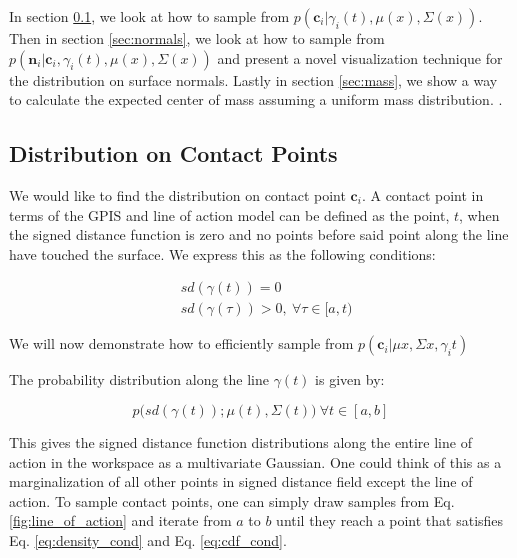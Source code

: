 \documentclass[letterpaper, 10 pt, conference]{ieeeconf}  %
\begin{document}
 In section \ref{sec:contact}, we look at how to sample from $p(\textbf{c}_i|\gamma_i(t),\mu(x),\Sigma(x))$. Then in section \ref{sec:normals}, we look at how to sample from $p(\textbf{n}_i|\textbf{c}_i,\gamma_i(t),\mu(x),\Sigma(x))$ and present a novel visualization technique for the distribution on surface normals. Lastly in section \ref{sec:mass}, we show a way to calculate the expected center of mass assuming a uniform mass distribution. 
 .
\subsection{Distribution on Contact Points}\label{sec:contact} 
We would like to find the distribution on contact point $\textbf{c}_i$. A contact point in terms of the GPIS and line of action model can be defined as the point, $t$, when the signed distance function is zero and no points before said point along the line have touched the surface. We express this as the following conditions: 

\vspace{-2ex}
\begin{align}
 &sd(\gamma(t)) = 0 \label{eq:density_cond} \\
&sd(\gamma(\tau)) > 0, \: \forall \tau \in [a,t) \label{eq:cdf_cond}
\end{align}

We will now demonstrate how to efficiently sample from $p(\textbf{c}_i|\mu{x},\Sigma{x},\gamma_i{t})$

The probability distribution along the line $\gamma(t)$ is given by:

\vspace{-2ex}
\begin{equation} \label{eq:line_of_act_dist}
p\big(sd(\gamma(t)) ; \mu(t),\Sigma(t)\big) \ \forall t \in [a,b] 
\end{equation}

This gives the signed distance function distributions along the entire line of action in the workspace as a multivariate Gaussian. One could think of this as a marginalization of all other points in signed distance field except the line of action. To sample contact points, one can simply draw samples from Eq. \ref{fig:line_of_action} and iterate from $a$ to $b$ until they reach a point that satisfies  Eq. \ref{eq:density_cond} and Eq. \ref{eq:cdf_cond}. 
\end{document}
